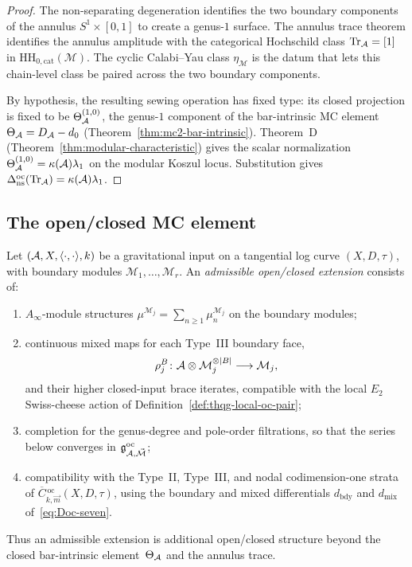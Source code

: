 \begin{proof}
The non-separating degeneration identifies the two boundary
components of the annulus $S^1 \times [0, 1]$ to create a
genus-$1$ surface. The annulus trace theorem identifies the annulus
amplitude with the categorical Hochschild class
$\operatorname{Tr}_{\mathcal{A}}=[1]$ in
$\mathrm{HH}_{0,\mathrm{cat}}(\mathcal M)$. The cyclic
Calabi--Yau class $\eta_{\mathcal M}$ is the datum that lets this
chain-level class be paired across the two boundary components.

By hypothesis, the resulting sewing operation has fixed type: its
closed projection is fixed to be
$\Theta_{\mathcal{A}}^{(1,0)}$, the genus-$1$ component of the bar-intrinsic
MC element $\Theta_{\mathcal{A}}=D_{\mathcal{A}}-d_0$
(Theorem~\ref{thm:mc2-bar-intrinsic}). Theorem~D
(Theorem~\ref{thm:modular-characteristic}) gives the scalar
normalization
$\Theta_{\mathcal{A}}^{(1,0)}=\kappa(\mathcal{A})\lambda_1$ on the modular Koszul
locus. Substitution gives
$\Delta_{\mathrm{ns}}^{\mathrm{oc}}(\operatorname{Tr}_{\mathcal{A}})
=\kappa(\mathcal{A})\lambda_1$.
\end{proof}

\subsection{The open/closed MC element}
\label{subsec:thqg-oc-mc-element}

\begin{definition}
\label{def:thqg-admissible-oc-extension}
Let $(\mathcal{A}, X, \langle \cdot,\cdot\rangle,k)$ be a gravitational
input on a tangential log curve $(X,D,\tau)$, with boundary modules
$\mathcal{M}_1,\ldots,\mathcal{M}_r$. An \emph{admissible
open/closed extension} consists of:
\begin{enumerate}[label=\textup{(\roman*)}]
\item $A_\infty$-module structures
 $\mu^{\mathcal{M}_j}=\sum_{n\geq 1}\mu_n^{\mathcal{M}_j}$ on the
 boundary modules;
\item continuous mixed maps for each Type~III boundary face,
 \[
 \rho_j^B\colon
 \mathcal{A}\otimes\mathcal{M}_j^{\otimes |B|}
 \longrightarrow
 \mathcal{M}_j,
 \]
 and their higher closed-input brace iterates, compatible with the
 local $E_2$ Swiss-cheese action of
 Definition~\ref{def:thqg-local-oc-pair};
 \item completion for the genus-degree and pole-order filtrations,
 so that the series below converges in
 $\mathfrak{g}^{\mathrm{oc}}_{\mathcal{A},\vec{\mathcal{M}}}$;
\item compatibility with the Type~II, Type~III, and nodal
 codimension-one strata of
 $\overline{C}{}^{\,\mathrm{oc}}_{k,\vec{m}}(X,D,\tau)$, using the
 boundary and mixed differentials $d_{\mathrm{bdy}}$ and
 $d_{\mathrm{mix}}$ of~\eqref{eq:Doc-seven}.
\end{enumerate}
Thus an admissible extension is additional open/closed structure
beyond the closed bar-intrinsic element~$\Theta_{\mathcal{A}}$ and the annulus
trace.
\end{definition}

